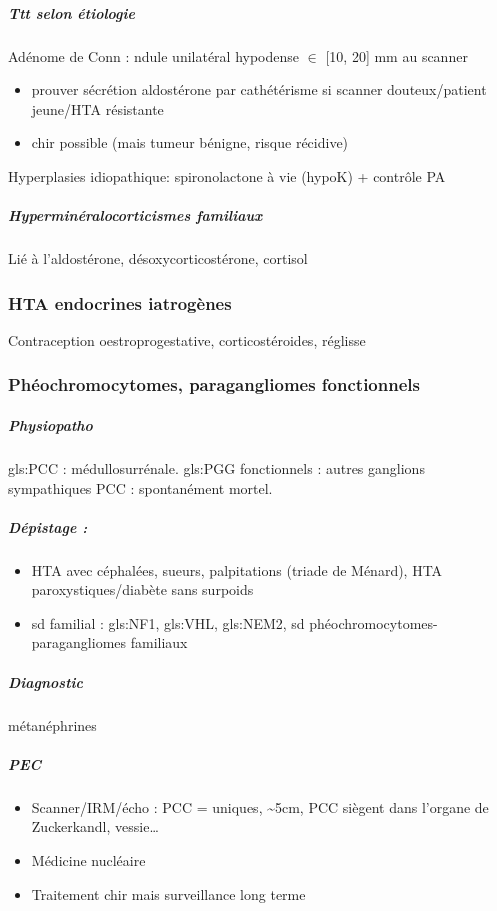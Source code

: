 \documentclass[11pt]{article}
\begin{document}
\subparagraph{Ttt selon étiologie}
\label{sec:org0739f4a}
Adénome de Conn : ndule unilatéral hypodense \(\in\) [10, 20] mm au scanner
\begin{itemize}
\item prouver sécrétion aldostérone par cathétérisme si scanner douteux/patient jeune/HTA résistante
\item chir possible (mais tumeur bénigne, risque récidive)
\end{itemize}
Hyperplasies idiopathique: spironolactone à vie (hypoK) + contrôle PA

\subparagraph{Hyperminéralocorticismes familiaux}
\label{sec:orgb1a5a72}
Lié à l'aldostérone, désoxycorticostérone, cortisol

\subsubsection{HTA endocrines iatrogènes}
\label{sec:org26f22d0}
Contraception oestroprogestative, corticostéroides, réglisse

\subsubsection{Phéochromocytomes, paragangliomes fonctionnels}
\label{sec:org7823285}
\subparagraph{Physiopatho}
\label{sec:org89c1a4e}
gls:PCC : médullosurrénale. gls:PGG fonctionnels : autres    ganglions sympathiques
 \faBomb{} PCC : spontanément mortel. 

\subparagraph{Dépistage :}
\label{sec:org9b43a68}
\begin{itemize}
\item HTA avec céphalées, sueurs, palpitations (triade de Ménard), HTA paroxystiques/diabète sans
surpoids
\item sd familial : gls:NF1, gls:VHL, gls:NEM2, sd phéochromocytomes-paragangliomes familiaux
\end{itemize}

\subparagraph{Diagnostic}
\label{sec:org5069e92}
\inc métanéphrines

\subparagraph{PEC}
\label{sec:org7e46d45}
\begin{itemize}
\item Scanner/IRM/écho : PCC = uniques, \textasciitilde{}5cm, PCC siègent dans l'organe de Zuckerkandl, vessie\ldots{}
\item Médicine nucléaire
\item Traitement chir mais surveillance long terme
\end{itemize}
\end{document}
